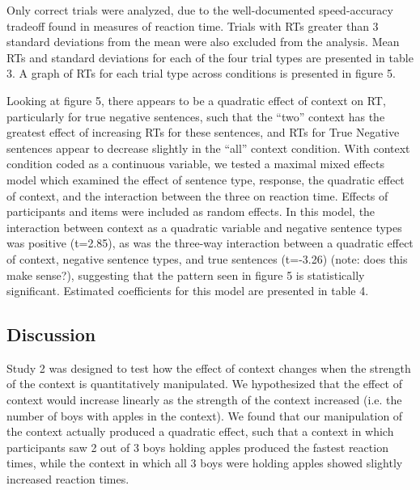 \documentclass[10pt,letterpaper]{article}
\begin{document}
Only correct trials were analyzed, due to the well-documented speed-accuracy tradeoff found in measures of reaction time.  Trials with RTs greater than 3 standard deviations from the mean were also excluded from the analysis.  Mean RTs and standard deviations for each of the four trial types are presented in table 3.  A graph of RTs for each trial type across conditions is presented in figure 5.  

Looking at figure 5, there appears to be a quadratic effect of context on RT, particularly for true negative sentences, such that the ``two'' context has the greatest effect of increasing RTs for these sentences, and RTs for True Negative sentences appear to decrease slightly in the ``all'' context condition.  With context condition coded as a continuous variable, we tested a maximal mixed effects model which examined the effect of sentence type, response, the quadratic effect of context, and the interaction between the three on reaction time.  Effects of participants and items were included as random effects.  In this model, the interaction between context as a quadratic variable and negative sentence types was positive (t=2.85), as was the three-way interaction between a quadratic effect of context, negative sentence types, and true sentences (t=-3.26) (note: does this make sense?), suggesting that the pattern seen in figure 5 is statistically significant.  Estimated coefficients for this model are presented in table 4.  

\subsection{Discussion}
Study 2 was designed to test how the effect of context changes when the strength of the context is quantitatively manipulated.  We hypothesized that the effect of context would increase linearly as the strength of the context increased (i.e. the number of boys with apples in the context).  We found that our manipulation of the context actually produced a quadratic effect, such that a context in which participants saw 2 out of 3 boys holding apples produced the fastest reaction times, while the context in which all 3 boys were holding apples showed slightly increased reaction times.  
\end{document}
